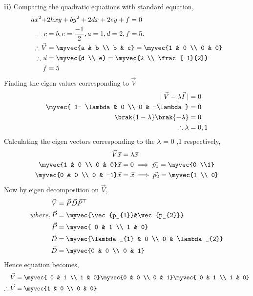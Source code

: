 \textbf{ii)}
Comparing the quadratic equations with standard equation,
\begin{align}
    ax^2+&2hxy+by^2+2dx+2ey+f=0\\
    \therefore c&=b,e=\frac{-1}{2}, a=1,d=2,f=5.\\
    \therefore \vec{V}&=\myvec{a & b \\ b & c}=\myvec{1 & 0 \\ 0 & 0}\\ \therefore \vec{u}&=\myvec{d \\ e}= \myvec{2 \\ \frac{-1}{2}}\\ f&=5
\end{align}
Finding the eigen values corresponding to  $\vec{V}$
\begin{align}
    \mid \vec{V}- \lambda \vec{I} \mid &=0\\
    \myvec{ 1- \lambda & 0 \\ 0 & -\lambda}&=0\\
    \brak{1 - \lambda}\brak{-\lambda}&=0 \\
    \therefore \lambda &= 0 ,1 
\end{align}
Calculating the eigen vectors corresponding to the $\lambda$ = 0 ,1 respectively,
\begin{align}
    \vec{V}\vec{x}&=\lambda\vec{x}\\
    \myvec{1 & 0 \\ 0 & 0}\vec{x}&=0 \implies \vec{p_{1}}=\myvec{0 \\1}\\
    \myvec{0 & 0 \\ 0 & -1}\vec{x} &= \vec{x} \implies \vec{p_{2}}= \myvec{1 \\ 0} 
\end{align}
Now by eigen decomposition on $\vec{V}$,
\begin{align}
    \vec{V}&= \vec{P}\vec{D}\vec{P}^{\top}\\
    where,\vec{P}&= \myvec{\vec{p_{1}}&\vec{p_{2}}}\\
    \vec{P}&=\myvec{ 0 & 1 \\ 1 & 0}\\
    \vec{D}&= \myvec{\lambda_{1} & 0 \\ 0 & \lambda_{2}}\\
    \vec{D}&= \myvec{0 & 0 \\ 0 & 1}
\end{align}
Hence equation becomes,
\begin{align}
    \vec{V}&= \myvec{ 0 & 1 \\ 1 & 0}\myvec{0 & 0 \\ 0 & 1}\myvec{ 0 & 1 \\ 1 & 0}\\
    \therefore \vec{V}&=\myvec{1 & 0 \\ 0 & 0}
\end{align}
